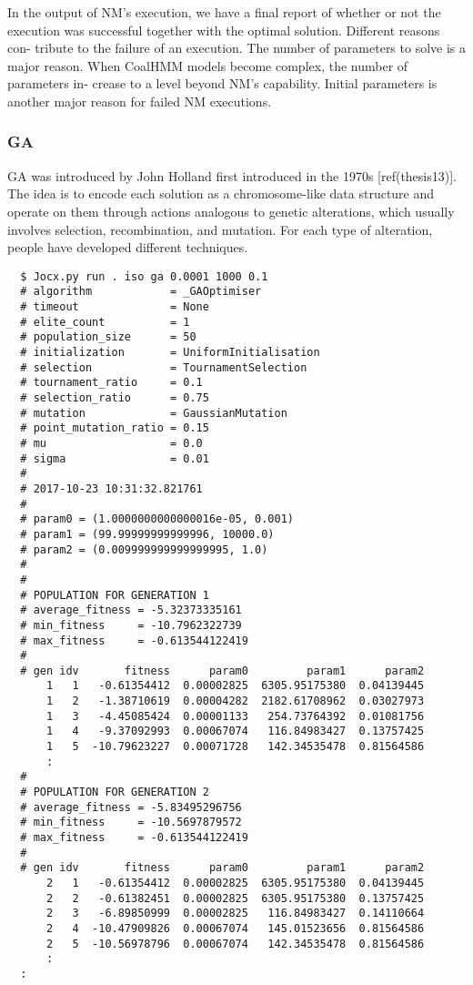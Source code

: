 In the output of NM’s execution, we have a final report of whether or not the
execution was successful together with the optimal solution. Different reasons
con- tribute to the failure of an execution. The number of parameters to solve
is a major reason. When CoalHMM models become complex, the number of parameters
in- crease to a level beyond NM’s capability. Initial parameters is another
major reason for failed NM executions.

\subsubsection{GA}

GA was introduced by John Holland first introduced in the 1970s [ref(thesis13)].
The idea is to encode each solution as a chromosome-like data structure and
operate on them through actions analogous to genetic alterations, which usually
involves selection, recombination, and mutation. For each type of alteration,
people have developed different techniques.

{\small{}\begin{verbatim}
  $ Jocx.py run . iso ga 0.0001 1000 0.1
  # algorithm            = _GAOptimiser
  # timeout              = None
  # elite_count          = 1
  # population_size      = 50
  # initialization       = UniformInitialisation
  # selection            = TournamentSelection
  # tournament_ratio     = 0.1
  # selection_ratio      = 0.75
  # mutation             = GaussianMutation
  # point_mutation_ratio = 0.15
  # mu                   = 0.0
  # sigma                = 0.01
  #
  # 2017-10-23 10:31:32.821761
  #
  # param0 = (1.0000000000000016e-05, 0.001)
  # param1 = (99.99999999999996, 10000.0)
  # param2 = (0.009999999999999995, 1.0)
  #
  #
  # POPULATION FOR GENERATION 1
  # average_fitness = -5.32373335161
  # min_fitness     = -10.7962322739
  # max_fitness     = -0.613544122419
  #
  # gen idv       fitness      param0         param1      param2
      1   1   -0.61354412  0.00002825  6305.95175380  0.04139445
      1   2   -1.38710619  0.00004282  2182.61708962  0.03027973
      1   3   -4.45085424  0.00001133   254.73764392  0.01081756
      1   4   -9.37092993  0.00067074   116.84983427  0.13757425
      1   5  -10.79623227  0.00071728   142.34535478  0.81564586
      :
  #
  # POPULATION FOR GENERATION 2
  # average_fitness = -5.83495296756
  # min_fitness     = -10.5697879572
  # max_fitness     = -0.613544122419
  #
  # gen idv       fitness      param0         param1      param2
      2   1   -0.61354412  0.00002825  6305.95175380  0.04139445
      2   2   -0.61382451  0.00002825  6305.95175380  0.13757425
      2   3   -6.89850999  0.00002825   116.84983427  0.14110664
      2   4  -10.47909826  0.00067074   145.01523656  0.81564586
      2   5  -10.56978796  0.00067074   142.34535478  0.81564586
      :
  :
\end{verbatim}}

